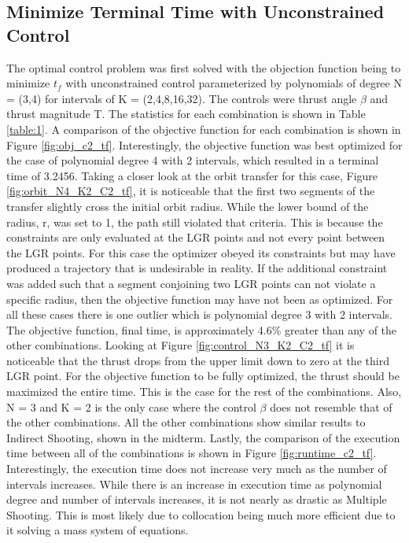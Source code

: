 \documentclass[]{article}
\begin{document}
    \subsection{Minimize Terminal Time with Unconstrained Control}
	 The optimal control problem was first solved with the objection function being to minimize \(t_f\) with unconstrained control parameterized by polynomials of degree N = (3,4) for intervals of K = (2,4,8,16,32). The controls were thrust angle \(\beta\) and thrust magnitude T. The statistics for each combination is shown in Table \ref{table:1}. A comparison of the objective function for each combination is shown in Figure \ref{fig:obj_c2_tf}. Interestingly, the objective function was best optimized for the case of polynomial degree 4 with 2 intervals, which resulted in a terminal time of 3.2456. Taking a closer look at the orbit transfer for this case, Figure \ref{fig:orbit_N4_K2_C2_tf}, it is noticeable that the first two segments of the transfer slightly cross the initial orbit radius. While the lower bound of the radius, r, was set to 1, the path still violated that criteria. This is because the constraints are only evaluated at the LGR points and not every point between the LGR points. For this case the optimizer obeyed its constraints but may have produced a trajectory that is undesirable in reality. If the additional constraint was added such that a segment conjoining two LGR points can not violate a specific radius, then the objective function may have not been as optimized. For all these cases there is one outlier which is polynomial degree 3 with 2 intervals. The objective function, final time, is approximately 4.6\% greater than any of the other combinations. Looking at Figure \ref{fig:control_N3_K2_C2_tf} it is noticeable that the thrust drops from the upper limit down to zero at the third LGR point. For the objective function to be fully optimized, the thrust should be maximized the entire time. This is the case for the rest of the combinations. Also, N = 3 and K = 2 is the only case where the control \(\beta\) does not resemble that of the other combinations. All the other combinations show similar results to Indirect Shooting, shown in the midterm. Lastly, the comparison of the execution time between all of the combinations is shown in Figure \ref{fig:runtime_c2_tf}. Interestingly, the execution time does not increase very much as the number of intervals increases. While there is an increase in execution time as polynomial degree and number of intervals increases, it is not nearly as drastic as Multiple Shooting. This is most likely due to collocation being much more efficient due to it solving a mass system of equations.
\end{document}
